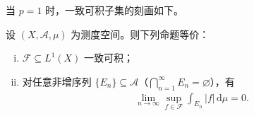 \documentclass[../../main.tex]{subfiles}%
\begin{document}
当 $p=1$ 时，一致可积子集的刻画如下。

\begin{proposition}\label{proposition:ch02-一致可积刻画}\label{proposition:ch02-一致可积判据}
设 $(X,\mathscr A,\mu)$ 为测度空间。则下列命题等价：
\begin{enumerate}[(i)]
\item $\mathscr F\subseteq L^1(X)$ 一致可积；
\item 对任意非增序列 $\{E_n\}\subseteq\mathscr A$（$\bigcap_{n=1}^\infty E_n=\varnothing $），有
\begin{align*}
\lim_{n\to\infty}\sup_{f\in\mathscr F}\int_{E_n}|f|\,\mathrm{d}\mu=0.
\end{align*}
\end{enumerate}
\end{proposition}
\end{document}
